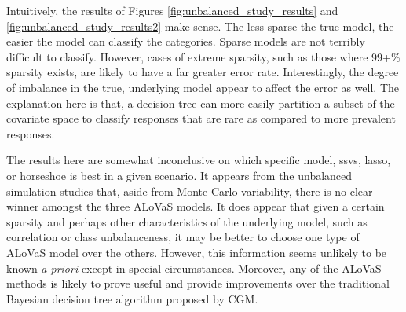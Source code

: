 
Intuitively, the results of Figures \ref{fig:unbalanced_study_results} and \ref{fig:unbalanced_study_results2} make sense. The less sparse the true model, the easier the model can classify the categories. Sparse models are not terribly difficult to classify. However, cases of extreme sparsity, such as those where 99+\% sparsity exists, are likely to have a far greater error rate. Interestingly, the degree of imbalance in the true, underlying model appear to affect the error as well. The explanation here is that, a decision tree can more easily partition a subset of the covariate space to classify responses that are rare as compared to more prevalent responses.

The results here are somewhat inconclusive on which specific model, ssvs, lasso, or horseshoe is best in a given scenario. It appears from the unbalanced simulation studies that, aside from Monte Carlo variability, there is no clear winner amongst the three ALoVaS models. It does appear that given a certain sparsity and perhaps other characteristics of the underlying model, such as correlation or class unbalanceness, it may be better to choose one type of ALoVaS model over the others. However, this information seems unlikely to be known \emph{a priori} except in special circumstances. Moreover, any of the ALoVaS methods is likely to prove useful and provide improvements over the traditional Bayesian decision tree algorithm proposed by CGM. 

